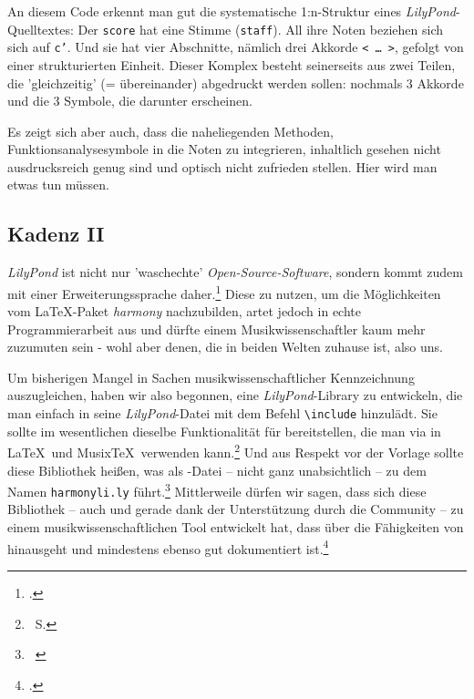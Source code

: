 An diesem Code erkennt man gut die systematische 1:n-Struktur eines
\textit{LilyPond}-Quelltextes: Der \texttt{score} hat eine Stimme
(\texttt{staff}). All ihre Noten beziehen sich sich auf \texttt{c'}. Und sie hat
vier Abschnitte, nämlich drei Akkorde \texttt{< \ldots\ >}, gefolgt von einer
strukturierten Einheit. Dieser Komplex besteht seinerseits aus zwei Teilen, die
'gleichzeitig' (= übereinander) abgedruckt werden sollen: nochmals 3 Akkorde und
die 3 Symbole, die darunter erscheinen.

Es zeigt sich aber auch, dass die naheliegenden Methoden,
Funktionsanalysesymbole in die Noten zu integrieren, inhaltlich gesehen nicht
ausdrucksreich genug sind und optisch nicht zufrieden stellen. Hier wird man
etwas tun müssen. 

\subsection{Kadenz II}

\textit{LilyPond} ist nicht nur 'waschechte' \textit{Open-Source-Software},
sondern kommt zudem mit einer Erweiterungssprache daher.\footcite[vgl.
dazu][\nopage wp.]{WpedGuile2019a} Diese zu nutzen, um die Möglichkeiten vom
\LaTeX-Paket \textit{harmony} nachzubilden, artet jedoch in echte
Programmierarbeit aus und dürfte einem Musikwissenschaftler kaum mehr zuzumuten
sein - wohl aber denen, die in beiden Welten zuhause ist, also uns.

\label{LilyPondFuncTheory}Um  bisherigen Mangel in Sachen
musikwissenschaftlicher Kennzeichnung auszugleichen, haben wir also begonnen,
eine \textit{LilyPond}-Library zu entwickeln, die man einfach in seine
\textit{LilyPond}-Datei mit dem Befehl \texttt{\textbackslash{include}}
hinzulädt. Sie sollte im wesentlichen dieselbe Funktionalität für 
bereitstellen, die man via  in \LaTeX\ und Musix\TeX\ verwenden
kann.\footnote{\ra\ S.\pageref{Harmony}} Und aus Respekt vor der Vorlage sollte
diese Bibliothek  heißen, was als -Datei -- nicht
ganz unabsichtlich -- zu dem Namen \texttt{harmonyli.ly} führt.\footnote{\ra\
} Mittlerweile dürfen wir sagen,
dass sich diese Bibliothek -- auch und gerade dank der Unterstützung durch die
Community -- zu einem musikwissenschaftlichen Tool entwickelt hat, dass über die
Fähigkeiten von \acc{Harmony} hinausgeht und mindestens ebenso gut dokumentiert
ist.\footcite[vgl.][1ff]{Reincke2019b}

